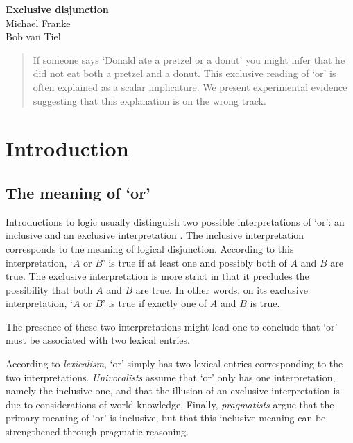 \documentclass[12pt]{article}
\begin{document}
\begin{center}
\noindent\LARGE \textbf{Exclusive disjunction} \\[.5cm]
\large Michael Franke\\[.1cm] 
\large Bob van Tiel
\end{center}

\begin{abstract}
If someone says `Donald ate a pretzel or a donut' you might infer that he did not eat both a pretzel and a donut. This exclusive reading of `or' is often explained as a scalar implicature. We present experimental evidence suggesting that this explanation is on the wrong track.
\end{abstract}

\section{Introduction}
\subsection*{The meaning of `or'}

Introductions to logic usually distinguish two possible interpretations of `or': an inclusive and an exclusive interpretation \citep[e.g.,][]{mccawley1981, copi2005}. The inclusive interpretation corresponds to the meaning of logical disjunction. According to this interpretation, `$A$ or $B$' is true if at least one and possibly both of $A$ and $B$ are true. The exclusive interpretation is more strict in that it precludes the possibility that both $A$ and $B$ are true. In other words, on its exclusive interpretation, `$A$ or $B$' is true if exactly one of $A$ and $B$ is true.

The presence of these two interpretations might lead one to conclude that `or' must be associated with two lexical entries. 
 



According to \emph{lexicalism}, `or' simply has two lexical entries corresponding to the two interpretations. \emph{Univocalists} assume that `or' only has one interpretation, namely the inclusive one, and that the illusion of an exclusive interpretation is due to considerations of world knowledge. Finally, \emph{pragmatists} argue that the primary meaning of `or' is inclusive, but that this inclusive meaning can be strengthened through pragmatic reasoning. 
\end{document}
